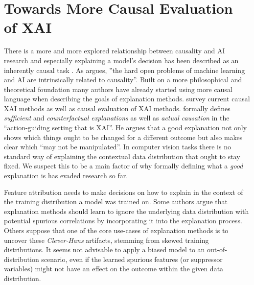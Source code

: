 \section{Towards More Causal Evaluation of XAI}\label{section:causal_xai}

There is a more and more explored relationship between causality and AI research and especially explaining a model's decision has been described as an inherently causal task \citep{Moraffah2020a, Beckers2022, Halpern2005a}.
As \citet{Schoelkopf2019} argues, ''the hard open problems of machine learning and AI are intrinsically related to causality''.
Built on a more philosophical and theoretical foundation \citep{Woodward2004, Halpern2005,Halpern2005a, Schoelkopf2019} many authors have already started using more causal language when describing the goals of explanation methods. \citet{Moraffah2020a} survey current causal XAI methods as well as causal evaluation of XAI methods.
\citet{Beckers2022} formally defines \textit{sufficient} and \textit{counterfactual explanations} as well as \textit{actual causation} in the ``action-guiding setting that is XAI''. He argues that a good explanation not only shows which things ought to be changed for a different outcome but also makes clear which ``may not be manipulated''. In computer vision tasks there is no standard way of explaining the contextual data distribution that ought to stay fixed. We suspect this to be a main factor of why formally defining what a \textit{good} explanation is has evaded research so far. 

Feature attribution needs to make decisions on how to explain in the context of the training distribution a model was trained on.
Some authors \citep{Kindermans2017,Wilming2023, Wilming2022} argue that explanation methods should learn to ignore the underlying data distribution with potential spurious correlations by incorporating it into the explanation process. Others suppose that one of the core use-cases of explanation methods is to uncover these \textit{Clever-Hans} artifacts, stemming from skewed training distributions. It seems not advisable to apply a biased model to an out-of-distribution scenario, even if the learned spurious features (or suppressor variables) might not have an effect on the outcome within the given data distribution.

